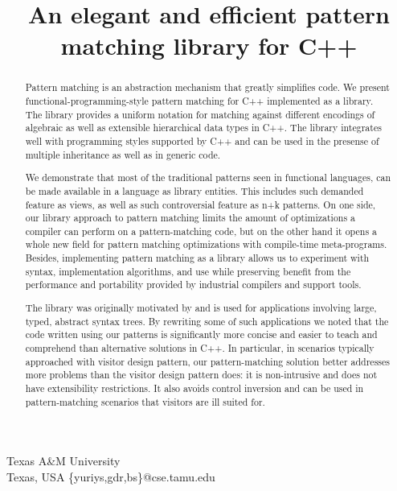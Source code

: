 \documentclass[preprint]{sigplanconf}
\makeatletter
\DeclareRobustCommand{\code}[1]{{\lstinline[breaklines=false,escapechar=@]{#1}}}
\makeatother
\begin{document}


\title{An elegant and efficient pattern matching library for C++}

           {Texas A\&M University\\ Texas, USA}
           {\{yuriys,gdr,bs\}@cse.tamu.edu}

\maketitle

\begin{abstract}
Pattern matching is an abstraction mechanism that greatly simplifies code. We 
present functional-programming-style pattern matching for C++ implemented as a 
library. The library provides a uniform notation for matching against different 
encodings of algebraic as well as extensible hierarchical data types in C++. The 
library integrates well with programming styles supported by C++ and can be used 
in the presense of multiple inheritance as well as in generic code.

We demonstrate that most of the traditional patterns seen in functional 
languages, can be made available in a language as library entities. This 
includes such demanded feature as views, as well as such controversial feature 
as n+k patterns. On one side, our library approach to pattern matching limits 
the amount of optimizations a compiler can perform on a pattern-matching code, 
but on the other hand it opens a whole new field for pattern matching 
optimizations with compile-time meta-programs. Besides, implementing pattern 
matching as a library allows us to experiment with syntax, implementation 
algorithms, and use while preserving benefit from the performance and 
portability provided by industrial compilers and support tools.

The library was originally motivated by and is used for applications involving 
large, typed, abstract syntax trees. By rewriting some of such applications we 
noted that the code written using our patterns is significantly more concise and 
easier to teach and comprehend than alternative solutions in C++. In particular, 
in scenarios typically approached with visitor design pattern, our 
pattern-matching solution better addresses more problems than the visitor design
pattern does: it is non-intrusive and does not have extensibility restrictions. 
It also avoids control inversion and can be used in pattern-matching scenarios 
that visitors are ill suited for.
\end{abstract}
\end{document}
